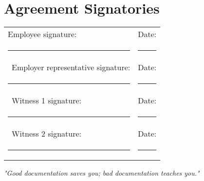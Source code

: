 \documentclass[a4paper,11pt]{article}
\begin{document}
\section*{Agreement Signatories}

\vspace{2em}
\noindent\begin{tabular}{@{}p{8cm}p{8cm}@{}}
Employee signature: & Date: \\
\rule{8cm}{0.4pt} & \rule{8cm}{0.4pt} \\\
Employer representative signature: & Date: \\
\rule{8cm}{0.4pt} & \rule{8cm}{0.4pt} \\\
Witness 1 signature: & Date: \\
\rule{8cm}{0.4pt} & \rule{8cm}{0.4pt} \\\
Witness 2 signature: & Date: \\
\rule{8cm}{0.4pt} & \rule{8cm}{0.4pt}
\end{tabular}

\vfill

\begin{center}
    \textit{"Good documentation saves you; bad documentation teaches you."}
\end{center}
\end{document}
